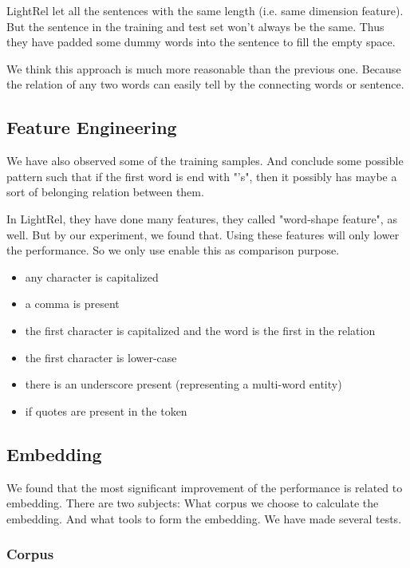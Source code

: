 LightRel let all the sentences with the same length (i.e. same dimension feature). But the sentence in the training and test set won't always be the same. Thus they have padded some dummy words into the sentence to fill the empty space.

We think this approach is much more reasonable than the previous one. Because the relation of any two words can easily tell by the connecting words or sentence.

\subsection{Feature Engineering}
\label{sec:feature_engineering}

We have also observed some of the training samples. And conclude some possible pattern such that if the first word is end with "'s", then it possibly has maybe a sort of belonging relation between them.

In LightRel, they have done many features, they called "word-shape feature", as well. But by our experiment, we found that. Using these features will only lower the performance. So we only use enable this as comparison purpose.

\begin{itemize}
    \item any character is capitalized
    \item a comma is present
    \item the first character is capitalized and the word is the first in the relation
    \item the first character is lower-case
    \item there is an underscore present (representing a multi-word entity)
    \item if quotes are present in the token
\end{itemize}

\subsection{Embedding}
\label{sec:embedding}

We found that the most significant improvement of the performance is related to embedding. There are two subjects: What corpus we choose to calculate the embedding. And what tools to form the embedding. We have made several tests.

\subsubsection{Corpus}
\label{sec:corpus}

